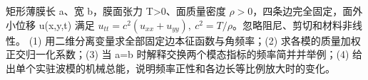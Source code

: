 矩形薄膜长 a、宽 b，膜面张力 T>0、面质量密度 \(\rho >0\)，四条边完全固定，面外小位移 u(x,y,t) 满足 \(u_{tt}=c^2(u_{xx}+u_{yy}),\ c^2=T/\rho\)。忽略阻尼、剪切和材料非线性。
(1) 用二维分离变量求全部固定边本征函数与角频率；(2) 求各模的质量加权正交归一化系数；(3) 当 a=b 时解释交换两个模态指标的频率简并并举例；(4) 给出单个实驻波模的机械总能，说明频率正性和各边长等比例放大时的变化。
